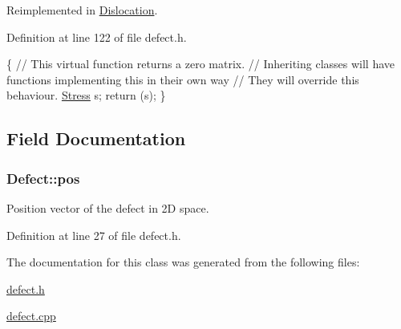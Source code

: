 Reimplemented in \hyperlink{classDislocation_af61cedf5305080ce0f55eb7177efe529}{Dislocation}.



Definition at line 122 of file defect.\-h.


\begin{DoxyCode}
  \{
    \textcolor{comment}{// This virtual function returns a zero matrix.}
    \textcolor{comment}{// Inheriting classes will have functions implementing this in their own
       way}
    \textcolor{comment}{// They will override this behaviour.}
    \hyperlink{classStress}{Stress} s;
    \textcolor{keywordflow}{return} (s);
  \}
\end{DoxyCode}


\subsection{Field Documentation}
\hypertarget{classDefect_aed2731c1beefc22e3db6ad5b18194cdd}{
\subsubsection[{pos}]{ Defect\-::pos\hspace{0.3cm}{\ttfamily [protected]}}}\label{d5/d4f/classDefect_aed2731c1beefc22e3db6ad5b18194cdd}


Position vector of the defect in 2\-D space. 



Definition at line 27 of file defect.\-h.



The documentation for this class was generated from the following files\-:\begin{DoxyCompactItemize}
\item 
\hyperlink{defect_8h}{defect.\-h}\item 
\hyperlink{defect_8cpp}{defect.\-cpp}\end{DoxyCompactItemize}
